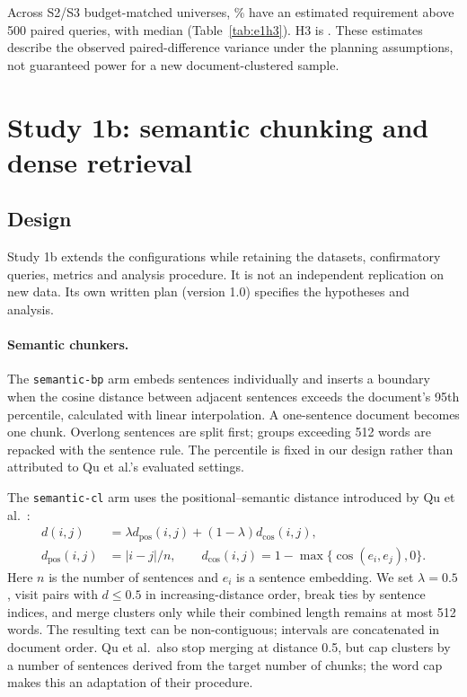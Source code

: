 \documentclass[11pt]{article}
\newcommand{\chunk}[1]{\texttt{#1}}
\begin{document}
Across S2/S3 budget-matched universes, \HThreeShare\% have an estimated requirement above 500 paired queries, with median \HThreeMedianN{} (Table~\ref{tab:e1h3}). H3 is \HThreeVerdict. These estimates describe the observed paired-difference variance under the planning assumptions, not guaranteed power for a new document-clustered sample.
\section{Study 1b: semantic chunking and dense retrieval}\label{sec:study1b}
\subsection{Design}
Study 1b extends the configurations while retaining the datasets, confirmatory queries, metrics and analysis procedure. It is not an independent replication on new data. Its own written plan (version 1.0) specifies the hypotheses and analysis.

\paragraph{Semantic chunkers.}
The \chunk{semantic-bp} arm embeds sentences individually and inserts a boundary when the cosine distance between adjacent sentences exceeds the document's 95th percentile, calculated with linear interpolation. A one-sentence document becomes one chunk. Overlong sentences are split first; groups exceeding 512 words are repacked with the sentence rule. The percentile is fixed in our design rather than attributed to Qu et al.'s evaluated settings.

The \chunk{semantic-cl} arm uses the positional--semantic distance introduced by Qu et al.~\cite{qu2025semanticchunking}:
\begin{align}
d(i,j)&=\lambda d_{\mathrm{pos}}(i,j)+(1-\lambda)d_{\mathrm{cos}}(i,j),\\
d_{\mathrm{pos}}(i,j)&=|i-j|/n,\qquad d_{\mathrm{cos}}(i,j)=1-\max\{\cos(e_i,e_j),0\}.
\end{align}
Here $n$ is the number of sentences and $e_i$ is a sentence embedding. We set $\lambda=0.5$, visit pairs with $d\leq0.5$ in increasing-distance order, break ties by sentence indices, and merge clusters only while their combined length remains at most 512 words. The resulting text can be non-contiguous; intervals are concatenated in document order. Qu et al.\ also stop merging at distance 0.5, but cap clusters by a number of sentences derived from the target number of chunks; the word cap makes this an adaptation of their procedure.
\end{document}
